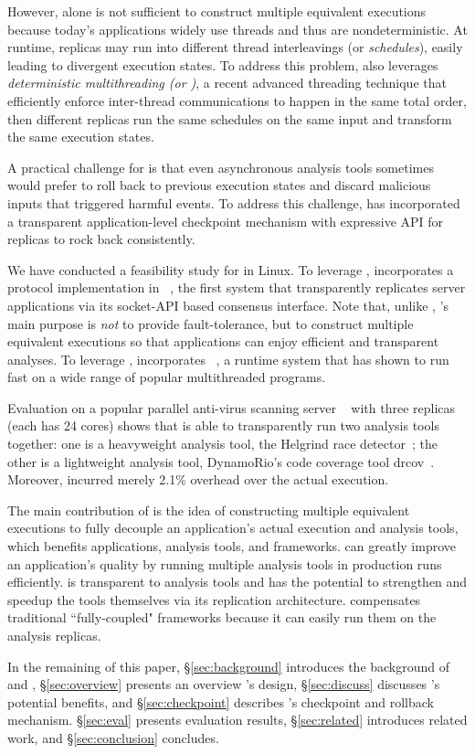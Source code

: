 However, \smr alone is not sufficient to construct multiple equivalent 
executions because today's applications widely use threads and thus are 
nondeterministic. At runtime, replicas may run into different thread
interleavings (or \emph{schedules}), easily leading to divergent execution
states. To address this problem, \xxx also leverages \emph{deterministic
multithreading (or \dmt)}, a recent advanced threading technique that
efficiently enforce inter-thread communications to happen in the same total
order, then different replicas run the same schedules on the same input and
transform the same execution states.


A practical challenge for \xxx is that even asynchronous analysis tools
sometimes would prefer to roll back to previous execution states and discard 
malicious inputs that triggered harmful events. To address this challenge, \xxx 
has incorporated a transparent application-level checkpoint mechanism with 
expressive API for replicas to rock back consistently.


We have conducted a feasibility study for \xxx in Linux. To leverage \smr, \xxx 
incorporates a \paxos protocol implementation in \repbox~\cite{repbox:sosp15}, 
the first \smr system that transparently replicates server applications via its 
socket-API based \paxos consensus interface. Note that, unlike \repbox, \xxx's 
main purpose is \emph{not} to provide fault-tolerance, but to construct multiple 
equivalent executions so that applications can enjoy efficient and transparent 
analyses. To leverage \dmt, \xxx incorporates \parrot~\cite{parrot:sosp13}, a \dmt 
runtime system that has shown to run fast on a wide range of popular 
multithreaded programs.

Evaluation on a popular parallel anti-virus scanning 
server \clamav~\cite{clamav} with three replicas (each has 24 cores) shows that 
\xxx is able to transparently run two analysis tools together: one is a 
heavyweight analysis tool, the Helgrind race detector~\cite{valgrind:pldi}; the 
other is a lightweight analysis tool, DynamoRio's code coverage tool 
drcov~\cite{dynamorio}. Moreover, \xxx incurred merely 2.1\% overhead over the 
actual execution.


The main contribution of \xxx is the idea of constructing multiple equivalent
executions to fully decouple an application's actual execution and analysis
tools, which benefits applications, analysis tools, and frameworks. \xxx can
greatly improve an application's quality by running multiple analysis tools in
production runs efficiently. \xxx is transparent to analysis tools and has the
potential to strengthen and speedup the tools themselves via its replication 
architecture. \xxx compensates traditional ``fully-coupled" frameworks because 
it can easily run them on the analysis replicas.


In the remaining of this paper, \S\ref{sec:background} introduces the 
background of \smr and \dmt, \S\ref{sec:overview} presents an overview \xxx's 
design, \S\ref{sec:discuss} discusses \xxx's potential benefits, and 
\S\ref{sec:checkpoint} describes \xxx's checkpoint and rollback mechanism. 
\S\ref{sec:eval} presents evaluation results, \S\ref{sec:related} introduces 
related work, and \S\ref{sec:conclusion} concludes.